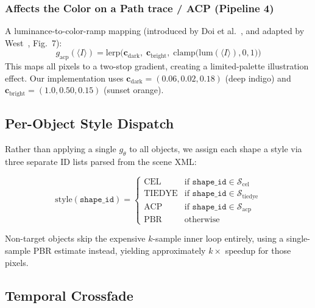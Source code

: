 \documentclass{article}
\begin{document}
\subsubsection{Affects the Color on a Path trace / ACP (Pipeline 4)}
\label{sec:acp}

A luminance-to-color-ramp mapping (introduced by Doi et al.~\cite{doi2021global}, and adapted by West~\cite{west2024stylized}, Fig.~7):
\begin{equation}
    g_{\text{acp}}(\langle I \rangle) = \text{lerp}\!\bigl(\mathbf{c}_{\text{dark}},\; \mathbf{c}_{\text{bright}},\; \text{clamp}\bigl(\text{lum}(\langle I \rangle), 0, 1\bigr)\bigr)
    \label{eq:acp}
\end{equation}
This maps all pixels to a two-stop gradient, creating a limited-palette illustration effect. Our implementation uses $\mathbf{c}_{\text{dark}} = (0.06, 0.02, 0.18)$ (deep indigo) and $\mathbf{c}_{\text{bright}} = (1.0, 0.50, 0.15)$ (sunset orange).


\subsection{Per-Object Style Dispatch}
\label{sec:dispatch}

Rather than applying a single $g_\theta$ to all objects, we assign each shape a style via three separate ID lists parsed from the scene XML:

\begin{equation}
    \text{style}(\texttt{shape\_id}) = 
    \begin{cases}
        \text{CEL}    & \text{if } \texttt{shape\_id} \in \mathcal{S}_{\text{cel}} \\
        \text{TIEDYE} & \text{if } \texttt{shape\_id} \in \mathcal{S}_{\text{tiedye}} \\
        \text{ACP}    & \text{if } \texttt{shape\_id} \in \mathcal{S}_{\text{acp}} \\
        \text{PBR}    & \text{otherwise}
    \end{cases}
    \label{eq:dispatch}
\end{equation}

Non-target objects skip the expensive $k$-sample inner loop entirely, using a single-sample PBR estimate instead, yielding approximately $k\!\times$ speedup for those pixels.


\subsection{Temporal Crossfade}
\label{sec:crossfade}
\end{document}
